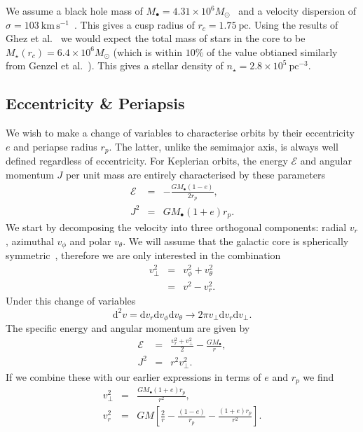 \documentclass[useAMS,usenatbib]{mn2e}
\newcommand{\units}[1]{\ensuremath{~\mathrm{#1}}}
\newcommand{\dd}{\ensuremath{\mathrm{d}}}
\begin{document}
We assume a black hole mass of $M_\bullet = 4.31 \times 10^6 M_\odot$~\cite{Gillessen2009} and a velocity dispersion of $\sigma = 103\units{km\,s^{-1}}$~\cite{Tremaine2002}. This gives a cusp radius of $r_c = 1.75\units{pc}$. Using the results of Ghez et al.~\cite{Ghez2006} we would expect the total mass of stars in the core to be $M_\star(r_c) = 6.4 \times 10^6 M_\odot$ (which is within $10\%$ of the value obtianed similarly from Genzel et al.~\cite{Genzel2003}). This gives a stellar density of $n_\star = 2.8 \times 10^5\units{pc^{-3}}$.

\subsection{Eccentricity \& Periapsis}

We wish to make a change of variables to characterise orbits by their eccentricity $e$ and periapse radius $r_p$. The latter, unlike the semimajor axis, is always well defined regardless of eccentricity. For Keplerian orbits, the energy $\mathcal{E}$ and angular momentum $J$ per unit mass are entirely characterised by these parameters
\begin{eqnarray}
\mathcal{E} & = & -\frac{GM_\bullet(1 - e)}{2r_p},\\
J^2 & = & GM_\bullet(1 + e)r_p.
\end{eqnarray}
We start by decomposing the velocity into three orthogonal components: radial $v_r$, azimuthal $v_\phi$ and polar $v_\theta$. We will assume that the galactic core is spherically symmetric~\cite{Genzel2003, Schodel2007}, therefore we are only interested in the combination
\begin{eqnarray}
v_\perp^2 & = & v_\phi^2 + v_\theta^2\\
 & = & v^2 - v_r^2.
\end{eqnarray}
Under this change of variables
\begin{equation}
\dd^2v = \dd v_r \dd v_\phi \dd v_\theta \rightarrow 2\pi v_\perp \dd v_r \dd v_\perp.
\end{equation}
The specific energy and angular momentum are given by
\begin{eqnarray}
\mathcal{E} & = & \frac{v_r^2 + v_\perp^2}{2} - \frac{GM_\bullet}{r},\\
J^2 & = & r^2 v_\perp^2.
\end{eqnarray}
If we combine these with our earlier expressions in terms of $e$ and $r_p$ we find
\begin{eqnarray}
v_\perp^2 & = & \frac{GM_\bullet(1 + e)r_p}{r^2},\\
v_r^2 & = & GM\left[\frac{2}{r} - \frac{(1 - e)}{r_p} - \frac{(1 + e)r_p}{r^2}\right].
\end{eqnarray}
\end{document}

